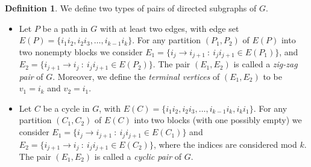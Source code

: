 \documentclass[11pt]{article}
\theoremstyle{definition}
\newtheorem{defi}[theo]{Definition}
\numberwithin{equation}{section}
\begin{document}
\begin{defi}
    We define two types of pairs of directed subgraphs of $G$.
    \begin{itemize}
        \item[(i)] Let $P$ be a path in $G$ with at least two edges, with edge set $E(P)=\{i_1i_2,i_2i_3,\dots,i_{k-1}i_k\}$. For any partition $(P_1,P_2)$ of $E(P)$ into two nonempty blocks we consider $E_1 = \{i_{j}\to i_{j+1} ~ : ~ i_{j}i_{j+1}\in E(P_1)\}$, and $E_2 = \{i_{j+1}\to i_{j} ~ : ~ i_{j}i_{j+1}\in E(P_2)\}$. The pair $(E_1,E_2)$ is called a \emph{zig-zag pair} of $G$.
        Moreover, we define the  \emph{terminal vertices} of $(E_1,E_2)$ to be $v_1=i_k$ and $v_2=i_1$.
        \item[(ii)] Let $C$ be a cycle in $G$, with $E(C)=\{i_1i_2,i_2i_3,\dots,i_{k-1}i_k, i_ki_1\}$. For any partition $(C_1,C_2)$ of $E(C)$ into two blocks (with one possibly empty) we consider $E_1 = \{i_{j}\to i_{j+1} ~ : ~ i_{j}i_{j+1}\in E(C_1)\}$ and $E_2 = \{i_{j+1}\to i_{j} ~ : ~ i_{j}i_{j+1}\in E(C_2)\}$, where the indices are considered mod $k$. The pair $(E_1,E_2)$ is called a \emph{cyclic pair} of $G$.
    \end{itemize}
\end{defi}
\end{document}
